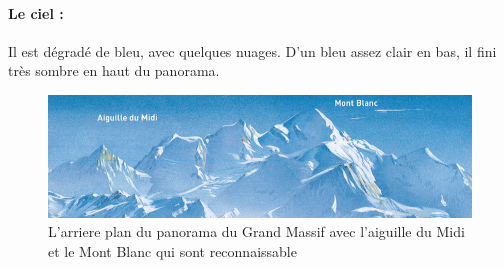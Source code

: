 \paragraph*{Le ciel :} Il est dégradé de bleu, avec quelques nuages. D'un bleu assez clair en bas, il fini très sombre en haut du panorama.   

\begin{figure}[!t]
\centering
 \includegraphics[width=1.0\linewidth]{novat/ciel_zoom.png}
 \caption{\label{fig:ciel}L'arriere plan du panorama du Grand Massif avec l'aiguille du Midi et le Mont Blanc qui sont reconnaissable}
\end{figure}
